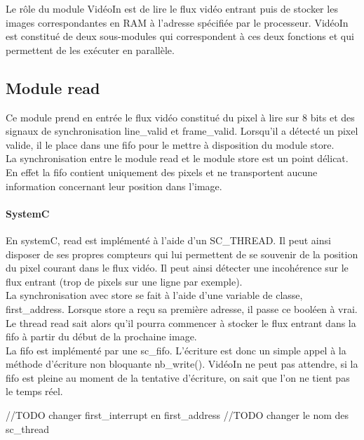 \documentclass[a4paper,12pt]{report}
\begin{document}
{{Le rôle du module VidéoIn est de lire le flux vidéo entrant puis de stocker les images correspondantes en RAM à l'adresse spécifiée par le processeur.
VidéoIn est constitué de deux sous-modules qui correspondent à ces deux fonctions et qui permettent de les exécuter en parallèle.


\subsection{Module read}
Ce module prend en entrée le flux vidéo constitué du pixel à lire sur 8 bits et des signaux de synchronisation line\_valid et frame\_valid.
Lorsqu'il a détecté un pixel valide, il le place dans une fifo pour le mettre à disposition du module store.\\
La synchronisation entre le module read et le module store est un point délicat.
En effet la fifo contient uniquement des pixels et ne transportent aucune information concernant leur position dans l'image.

\paragraph{SystemC}
En systemC, read est implémenté à l'aide d'un SC\_THREAD.
Il peut ainsi disposer de ses propres compteurs qui lui permettent de se souvenir de la position
du pixel courant dans le flux vidéo.
Il peut ainsi détecter une incohérence sur le flux entrant (trop de pixels sur une ligne par exemple).\\
La synchronisation avec store se fait à l'aide d'une variable de classe, first\_address.
Lorsque store a reçu sa première adresse, il passe ce booléen à vrai.
Le thread read sait alors qu'il pourra commencer à stocker le flux entrant dans la fifo à partir du début de la prochaine image.\\
La fifo est implémenté par une sc\_fifo.
L'écriture est donc un simple appel à la méthode d'écriture non bloquante nb\_write().
VidéoIn ne peut pas attendre,
si la fifo est pleine au moment de la tentative d'écriture, on sait que l'on ne tient pas le temps réel.

//TODO changer first\_interrupt en first\_address
//TODO changer le nom des sc\_thread

}}
\end{document}
